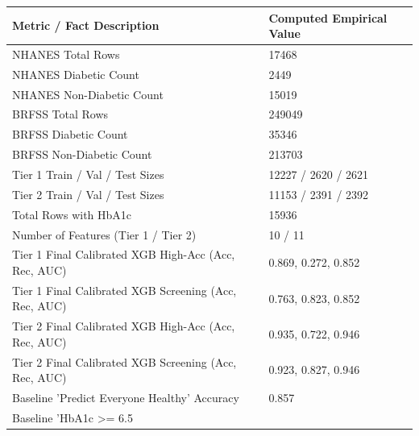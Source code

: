 \begin{tabular}{ll}
\toprule
Metric / Fact Description & Computed Empirical Value \\
\midrule
NHANES Total Rows & 17468 \\
NHANES Diabetic Count & 2449 \\
NHANES Non-Diabetic Count & 15019 \\
BRFSS Total Rows & 249049 \\
BRFSS Diabetic Count & 35346 \\
BRFSS Non-Diabetic Count & 213703 \\
Tier 1 Train / Val / Test Sizes & 12227 / 2620 / 2621 \\
Tier 2 Train / Val / Test Sizes & 11153 / 2391 / 2392 \\
Total Rows with HbA1c & 15936 \\
Number of Features (Tier 1 / Tier 2) & 10 / 11 \\
Tier 1 Final Calibrated XGB High-Acc (Acc, Rec, AUC) & 0.869, 0.272, 0.852 \\
Tier 1 Final Calibrated XGB Screening (Acc, Rec, AUC) & 0.763, 0.823, 0.852 \\
Tier 2 Final Calibrated XGB High-Acc (Acc, Rec, AUC) & 0.935, 0.722, 0.946 \\
Tier 2 Final Calibrated XGB Screening (Acc, Rec, AUC) & 0.923, 0.827, 0.946 \\
Baseline 'Predict Everyone Healthy' Accuracy & 0.857 \\
Baseline 'HbA1c >= 6.5%
\bottomrule
\end{tabular}

